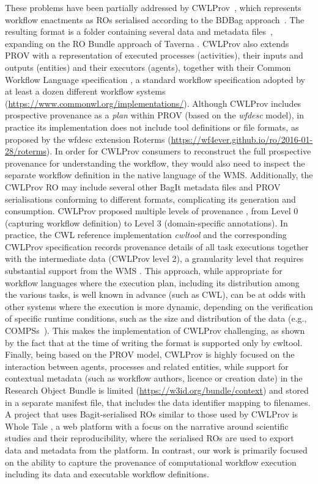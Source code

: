 \documentclass[10pt,letterpaper]{article}
\begin{document}
These problems have been partially addressed by CWLProv~\cite{Khan 2019}, which represents workflow enactments as ROs serialised according to the BDBag approach~\cite{Chard 2016}.
The resulting format is a folder containing several data and metadata files~\cite{Soiland-Reyes 2018}, expanding on the RO Bundle approach of Taverna \cite{Soiland-Reyes 2016}.
CWLProv also extends PROV with a representation of executed processes (activities), their inputs and outputs (entities) and their executors (agents), together with their Common Workflow Language specification
\cite{Crusoe 2022}, a standard workflow specification adopted by at least a dozen different workflow systems (\url{https://www.commonwl.org/implementations/}). Although CWLProv includes prospective provenance as a \emph{plan}
within PROV (based on the \emph{wfdesc} model), in practice its implementation does not include tool definitions or file formats, as proposed by the wfdesc extension Roterms (\url{https://wf4ever.github.io/ro/2016-01-28/roterms}).
In order for CWLProv consumers to reconstruct the full prospective provenance for understanding the workflow, they would also need to inspect the separate workflow definition in the native language of the WMS.
Additionally, the CWLProv RO may include several other BagIt metadata files and PROV serialisations conforming to different formats, complicating its generation and consumption.
CWLProv proposed multiple levels of provenance \cite[figure 2]{Khan 2019}, from Level 0 (capturing workflow definition) to Level 3 (domain-specific annotations). 
In practice, the CWL reference implementation \emph{cwltool} \cite{Amstutz 2023} and the corresponding CWLProv specification \cite{Soiland-Reyes 2018} records provenance details of all task executions together with the intermediate data (CWLProv level 2), a granularity level that requires substantial support from the WMS
\cite{Soiland-Reyes 2022a}.
This approach, while appropriate for workflow languages where the execution plan, including its distribution among the various tasks, is well known in advance (such as CWL), can be at odds with other systems where the execution is more dynamic, depending on the verification of specific runtime conditions, such as the size and distribution of the data (e.g., COMPSs~\cite{Lordan 2014}).
This makes the implementation of CWLProv challenging, as shown by the fact that at the time of writing the format is supported only by cwltool.
Finally, being based on the PROV model, CWLProv is highly focused on the interaction between agents, processes and related entities, while support for contextual metadata (such as workflow authors, licence or creation date) in the Research Object Bundle is limited (\url{https://w3id.org/bundle/context}) and stored in a separate manifest file, that includes the data identifier mapping to filenames.
A project that uses Bagit-serialised ROs similar to those used by CWLProv is Whole Tale \cite{Chard 2019}, a web platform with a focus on the narrative around scientific studies and their reproducibility, where the serialised ROs are used to export data and metadata from the platform. In contrast, our work is primarily focused on the ability to capture the provenance of computational workflow execution including its data and executable workflow definitions.
\end{document}
